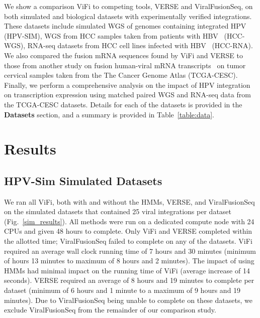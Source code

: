 \documentclass[12pt]{article}
\begin{document}
We show a comparison ViFi to competing tools, VERSE and ViralFusionSeq, on both simulated and biological datasets with experimentally verified integrations.  These datasets include simulated WGS of genomes containing integrated HPV (HPV-SIM), WGS from HCC samples taken from patients with HBV~\cite{Sung2012} (HCC-WGS), RNA-seq datasets from HCC cell lines infected with HBV~\cite{Lau2014} (HCC-RNA).  We also compared the fusion mRNA sequences found by ViFi and VERSE to those from another study on fusion human-viral mRNA transcripts~\cite{Tang2013} on tumor cervical samples taken from the The Cancer Genome Atlas (TCGA-CESC).  Finally, we perform a comprehensive analysis on the impact of HPV integration on transcription expression using matched paired WGS and RNA-seq data from the TCGA-CESC datasets.  Details for each of the datasets is provided in the \textbf{Datasets} section, and a summary is provided in Table~\ref{table:data}. 


\section{Results}

\subsection{HPV-Sim Simulated Datasets}
We ran all ViFi, both with and without the HMMs, VERSE, and ViralFusionSeq on the simulated datasets that contained 25 viral integrations per dataset (Fig.~\ref{sim_results}).  All methods were run on a dedicated compute node with 24 CPUs and given 48 hours to complete.  Only ViFi and VERSE completed within the allotted time; ViralFusionSeq failed to complete on any of the datasets.  ViFi required an average wall clock running time of 7 hours and 30 minutes (minimum of hours 13 minutes to maximum of 8 hours and 2 minutes).  The impact of using HMMs had minimal impact on the running time of ViFi (average increase of 14 seconds).  VERSE required an average of 8 hours and 19 minutes to complete per dataset (minimum of 6 hours and 1 minute to a maximum of 9 hours and 19 minutes).  Due to ViralFusionSeq being unable to complete on these datasets, we exclude ViralFusionSeq from the remainder of our comparison study.
\end{document}
